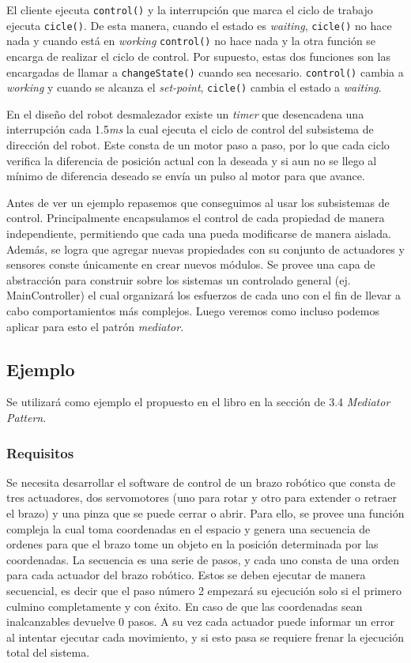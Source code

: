 El cliente ejecuta \verb|control()| y la interrupción que marca el ciclo de trabajo ejecuta \verb|cicle()|. De esta manera, cuando el estado es \textit{waiting}, \verb|cicle()| no hace nada y cuando está en \textit{working} \verb|control()| no hace nada y la otra función se encarga de realizar el ciclo de control.
Por supuesto, estas dos funciones son las encargadas de llamar a \verb|changeState()| cuando sea necesario. \verb|control()| cambia a \textit{working} y cuando se alcanza el \textit{set-point}, \verb|cicle()| cambia el estado a \textit{waiting}.

En el diseño del robot desmalezador\cite{paperPomponio} existe un \textit{timer} que desencadena una interrupción cada 1.5\textit{ms} la cual ejecuta el ciclo de control del subsistema de dirección del robot. Este consta de un motor paso a paso, por lo que cada ciclo verifica la diferencia de posición actual con la deseada y si aun no se llego al mínimo de diferencia deseado se envía un pulso al motor para que avance.

Antes de ver un ejemplo repasemos que conseguimos al usar los subsistemas de control. Principalmente encapsulamos el control de cada propiedad de manera independiente, permitiendo que cada una pueda modificarse de manera aislada. Además, se logra que agregar nuevas propiedades con su conjunto de actuadores y sensores conste únicamente en crear nuevos módulos. Se provee una capa de abstracción para construir sobre los sistemas un controlado general (ej. MainController) el cual organizará los esfuerzos de cada uno con el fin de llevar a cabo comportamientos más complejos. Luego veremos como incluso podemos aplicar para esto el patrón \textit{mediator}.

\subsection{Ejemplo}

Se utilizará como ejemplo el propuesto en el libro \cite{douglass} en la sección de 3.4 \textit{Mediator Pattern}.

\subsubsection*{Requisitos}

Se necesita desarrollar el software de control de un brazo robótico que consta de tres actuadores, dos servomotores (uno para rotar y otro para extender o retraer el brazo) y una pinza que se puede cerrar o abrir. Para ello, se provee una función compleja la cual toma coordenadas en el espacio y genera una secuencia de ordenes para que el brazo tome un objeto en la posición determinada por las coordenadas. La secuencia es una serie de pasos, y cada uno consta de una orden para cada actuador del brazo robótico. Estos se deben ejecutar de manera secuencial, es decir que el paso número 2 empezará su ejecución solo si el primero culmino completamente y con éxito. En caso de que las coordenadas sean inalcanzables devuelve 0 pasos. A su vez cada actuador puede informar un error al intentar ejecutar cada movimiento, y si esto pasa se requiere frenar la ejecución total del sistema.

